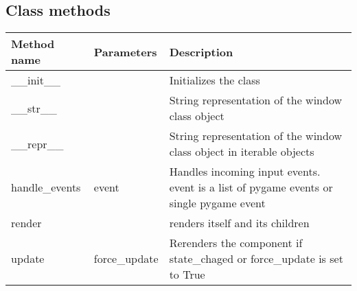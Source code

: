 \documentclass{scrartcl}
\begin{document}
    \subsection{Class methods}
    \begin{tabular}{|p{}|p{}|p{}|}
        \hline
        Method name & Parameters & Description\\
        \hline
        \_\_init\_\_ &  & Initializes the class\\
        \hline
        \_\_str\_\_ & &String representation of the window class object\\
        \hline
        \_\_repr\_\_ & & String representation of the window class object in iterable objects\\
        \hline
        handle\_events & event & Handles incoming input events. event is a list of pygame events or single pygame event\\
        \hline
        render &  & renders itself and its children\\
        \hline
        update & force\_update & Rerenders the component if state\_chaged or force\_update is set to True\\
        \hline
    \end{tabular}
\end{document}
